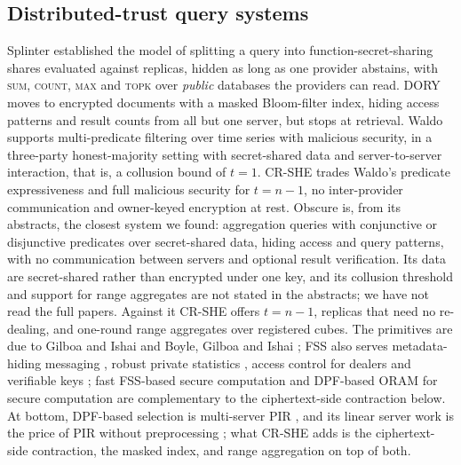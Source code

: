 \documentclass[a4paper,fleqn]{cas-sc}
\begin{document}
\subsection{Distributed-trust query systems}
Splinter \citep{splinter} established the model of splitting a query into
function-secret-sharing shares evaluated against replicas, hidden as long as
one provider abstains, with \textsc{sum}, \textsc{count}, \textsc{max} and
\textsc{topk} over \emph{public} databases the providers can read. DORY
\citep{dory} moves to encrypted documents with a masked Bloom-filter index,
hiding access patterns and result counts from all but one server, but stops at
retrieval. Waldo \citep{waldo} supports multi-predicate filtering over
time series with malicious security, in a three-party honest-majority setting
with secret-shared data and server-to-server interaction, that is, a
collusion bound of $t=1$. CR-SHE trades Waldo's predicate expressiveness and
full malicious security for $t=n-1$, no inter-provider communication and
owner-keyed encryption at rest. Obscure \citep{gupta2019obscure,gupta2020obscure}
is, from its abstracts, the closest system we found: aggregation queries with
conjunctive or disjunctive predicates over secret-shared data, hiding access
and query patterns, with no communication between servers and optional result
verification. Its data are secret-shared rather than encrypted under one key,
and its collusion threshold and support for range aggregates are not stated in
the abstracts; we have not read the full papers. Against it CR-SHE offers
$t=n-1$, replicas that need no re-dealing, and one-round range aggregates over
registered cubes. The primitives are due to Gilboa and Ishai
\citep{gilboa2014distributed} and Boyle, Gilboa and Ishai
\citep{boyle2015function,boyle2016function}; FSS also serves metadata-hiding
messaging \citep{express}, robust private statistics
\citep{corrigan2017prio,boneh2021lightweight}, access control for dealers
\citep{pacl} and verifiable keys \citep{decastro2022lightweight}; fast
FSS-based secure computation \citep{storrier2023grotto} and DPF-based ORAM for
secure computation \citep{doerner2017scaling} are complementary to the
ciphertext-side contraction below. At bottom,
DPF-based selection is multi-server PIR \citep{chor1998private}, and its linear
server work is the price of PIR without preprocessing
\citep{beimel2000reducing}; what CR-SHE adds is the ciphertext-side
contraction, the masked index, and range aggregation on top of both.
\end{document}
